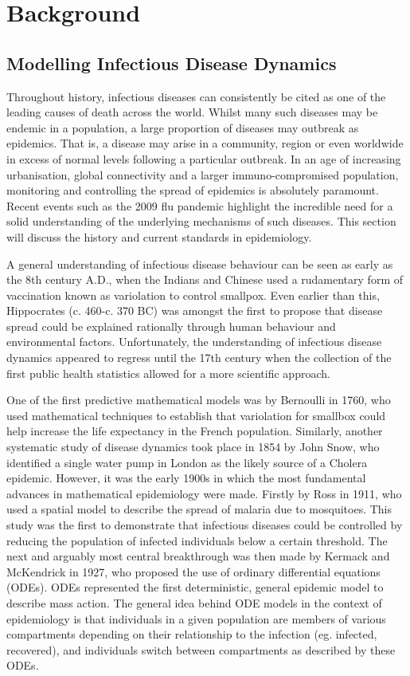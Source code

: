 \documentclass[11pt, a4paper, oneside,titlepage]{article}
\begin{document}
\newpage
\section{Background}
\subsection{Modelling Infectious Disease Dynamics}
Throughout history, infectious diseases can consistently be cited as one of the leading causes of death across the world. Whilst many such diseases may be endemic in a population,  a large proportion  of diseases may outbreak as epidemics. That is, a disease may arise in a community, region or even worldwide in excess of normal levels following a particular outbreak. In an age of increasing urbanisation, global connectivity and a larger immuno-compromised population, monitoring and controlling the spread of epidemics is absolutely paramount.\cite{computational} Recent events such as the 2009 flu pandemic highlight the incredible need for a solid understanding of the underlying mechanisms of such diseases. This section will discuss the history and current standards in epidemiology.

A general understanding of infectious disease behaviour can be seen as early as the 8th century A.D., when the Indians and Chinese used a rudamentary form of vaccination known as variolation to control smallpox.\cite{variolation} Even earlier than this, Hippocrates (c. 460-c. 370 BC) was amongst the first to propose that disease spread could be explained rationally through human behaviour and environmental factors.\cite{hippo} Unfortunately, the understanding of infectious disease dynamics appeared to regress until the 17th century when the collection of the first public health statistics allowed for a more scientific approach. 

One of the first predictive mathematical models was by Bernoulli in 1760, who used mathematical techniques to establish that variolation for smallbox could help increase the life expectancy in the French population.\cite{brauer} Similarly, another systematic study of disease dynamics took place in 1854 by John Snow, who identified a single water pump in London as the likely source of a Cholera epidemic.\cite{snow} However, it was the early 1900s in which the most fundamental advances in mathematical epidemiology were made. Firstly by Ross in 1911, who used a spatial model to describe the spread of malaria due to mosquitoes.\cite{snow} This study was the first to demonstrate that infectious diseases could be controlled by reducing the population of infected individuals below a certain threshold. The next and arguably most central breakthrough was then made by Kermack and McKendrick in 1927, who proposed the use of ordinary differential equations (ODEs).\cite{kermack} ODEs represented the first deterministic, general epidemic model to describe mass action. The general idea behind ODE models in the context of epidemiology is that individuals in a given population are members of various compartments depending on their relationship to the infection (eg. infected, recovered), and individuals switch between compartments as described by these ODEs.
\end{document}

